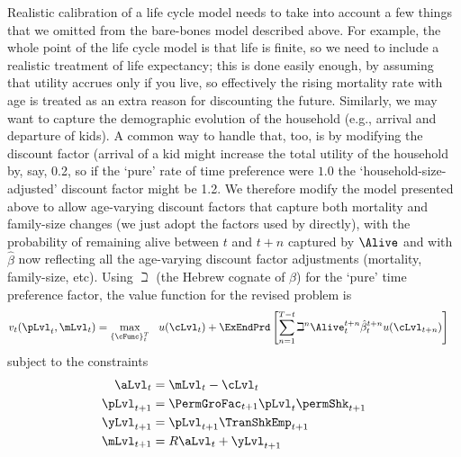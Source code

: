 Realistic calibration of a life cycle model needs to take into account a few things that we omitted from the bare-bones model described above. For example, the whole point of the life cycle model is that life is finite, so we need to include a realistic treatment of life expectancy; this is done easily enough, by assuming that utility accrues only if you live, so effectively the rising mortality rate with age is treated as an extra reason for discounting the future.  Similarly, we may want to capture the demographic evolution of the household (e.g., arrival and departure of kids).  A common way to handle that, too, is by modifying the discount factor (arrival of a kid might increase the total utility of the household by, say, 0.2, so if the `pure' rate of time preference were $1.0$ the `household-size-adjusted' discount factor might be 1.2.  We therefore modify the model presented above to allow age-varying discount factors that capture both mortality and family-size changes (we just adopt the factors used by \cite{cagettiWprofiles} directly), with the probability of remaining alive between $t$ and $t+n$ captured by $\Alive$ and with $\hat{\beta}$ now reflecting all the age-varying discount factor adjustments (mortality, family-size, etc).  Using $\beth$ (the Hebrew cognate of $\beta$) for the `pure' time preference factor, the value function for the revised problem is
  \begin{equation}\begin{gathered}\begin{aligned}
        v_{t}(\pLvl_{t},\mLvl_{t}) & =    \max_{\{\cFunc\}_{t}^{T}}~~ u(\cLvl_{t})+\ExEndPrd\left[\sum_{n=1}^{T-t} {\beth}^{n} \Alive_{t}^{t+n}\hat{\beta}_{t}^{t+n} u(\cLvl_{t+n}) \right]   \label{eq:lifecyclemax}
      \end{aligned}\end{gathered}  \end{equation}
subject to the constraints
  \begin{equation*}\begin{gathered}\begin{aligned}
        \aLvl_{t}  & = \mLvl_{t}-\cLvl_{t}
        \\      \pLvl_{t+1}  & = \PermGroFac_{t+1}\pLvl_{t}\permShk_{t+1}
        \\      \yLvl_{t+1}  & = \pLvl_{t+1}\TranShkEmp _{t+1}
        \\      \mLvl_{t+1}  & = R \aLvl_{t}+\yLvl_{t+1}
      \end{aligned}\end{gathered}\end{equation*}
